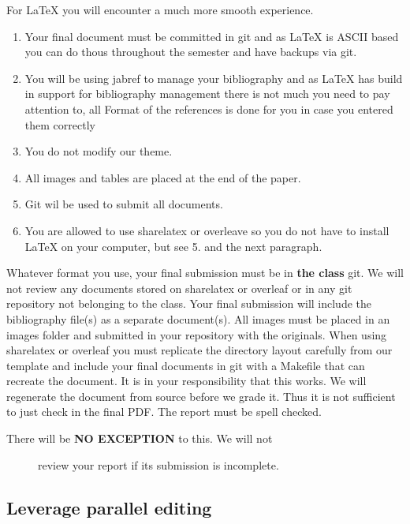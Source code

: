 For LaTeX you will encounter a much more smooth experience.

\begin{enumerate}
\def\labelenumi{\arabic{enumi}.}
\tightlist
\item
  Your final document must be committed in git and as LaTeX is ASCII
  based you can do thous throughout the semester and have backups via
  git.
\item
  You will be using jabref to manage your bibliography and as LaTeX has
  build in support for bibliography management there is not much you
  need to pay attention to, all Format of the references is done for you
  in case you entered them correctly
\item
  You do not modify our theme.
\item
  All images and tables are placed at the end of the paper.
\item
  Git wil be used to submit all documents.
\item
  You are allowed to use sharelatex or overleave so you do not have to
  install LaTeX on your computer, but see 5. and the next paragraph.
\end{enumerate}

Whatever format you use, your final submission must be in \textbf{the
class} git. We will not review any documents stored on sharelatex or
overleaf or in any git repository not belonging to the class. Your final
submission will include the bibliography file(s) as a separate
document(s). All images must be placed in an images folder and submitted
in your repository with the originals. When using sharelatex or overleaf
you must replicate the directory layout carefully from our template and
include your final documents in git with a Makefile that can recreate
the document. It is in your responsibility that this works. We will
regenerate the document from source before we grade it. Thus it is not
sufficient to just check in the final PDF. The report must be spell
checked.

\begin{description}
\item[There will be \textbf{NO EXCEPTION} to this. We will not]
review your report if its submission is incomplete.
\end{description}

\subsection{Leverage parallel editing}\label{leverage-parallel-editing}

